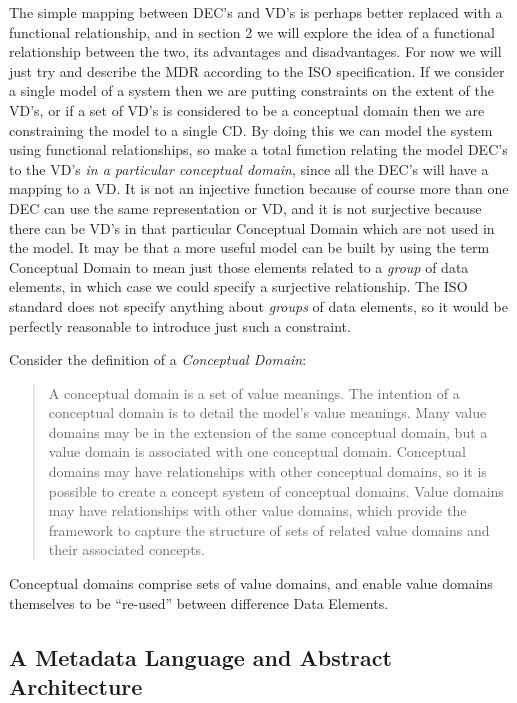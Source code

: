 The simple mapping between DEC's and VD's is perhaps better replaced with a functional relationship, and in section 2 we will explore the idea of a functional relationship between the two, its advantages and disadvantages. For now we will just try and describe the MDR according to the ISO specification. If we consider a single model of a system then we are putting constraints on the extent of the VD's, or if a set of VD's is considered to be a conceptual domain then we are constraining the model to a single CD.  By doing this we can model the system using functional relationships, so make a total function relating the model DEC's to the VD's \emph{in a particular conceptual domain}, since all the DEC's will have a mapping to a VD. It is not an injective function because of course more than one DEC can use the same representation or VD, and it is not surjective because there can be VD's in that particular Conceptual Domain which are not used in the model. It may be that a more useful model can be built by using the term Conceptual Domain to mean just those elements related to a \emph{group} of data elements, in which case we could specify a surjective relationship.  The ISO standard does not specify anything about \emph{groups} of data elements, so it would be perfectly reasonable to introduce just such a constraint. 


 

Consider the definition of a \emph{Conceptual Domain}:
\begin{quote}
	A conceptual domain is a set of value meanings. The intention of a conceptual domain is to detail the model's value meanings. Many value domains may be in the extension of the same conceptual domain, but a value domain is associated with one conceptual domain. Conceptual domains may have relationships with other conceptual domains, so it is possible to create a concept system of conceptual domains. Value domains may have relationships with other value domains, which provide the framework to capture the structure of sets of related value domains and their associated concepts.	
\end{quote}
Conceptual domains comprise sets of value domains, and enable value domains themselves to be ``re-used'' between difference Data Elements. 


\subsection{A Metadata Language and Abstract Architecture }

